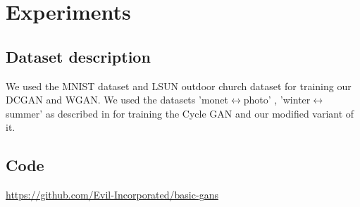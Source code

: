 \documentclass{article}
\begin{document}
\section{Experiments}
\label{results}
\subsection{Dataset description}
We used the MNIST dataset \cite{mnist} and LSUN outdoor church dataset \cite{yu15lsun} for training our DCGAN and WGAN.
We used the datasets 'monet$\leftrightarrow$photo' , 'winter$\leftrightarrow$summer' as described in \cite{cyclegan} for training the Cycle GAN and our modified variant of it.
\subsection{Code}
\url{https://github.com/Evil-Incorporated/basic-gans}
\end{document}
